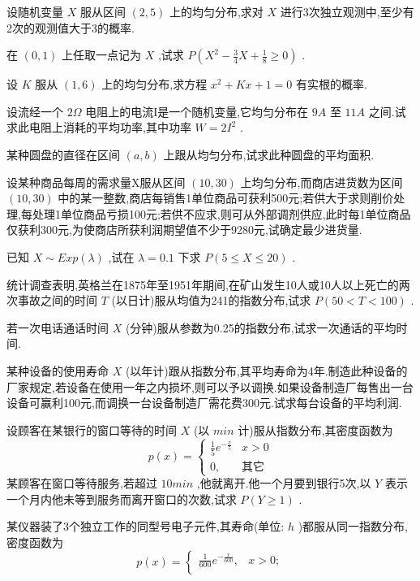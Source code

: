\begin{xiti}
\item 设随机变量 $ X $ 服从区间 $ (2,5) $ 上的均匀分布,求对 $ X $ 进行3次独立观测中,至少有2次的观测值大于3的概率.
\item 在 $ (0,1) $ 上任取一点记为 $ X $ ,试求 $ P\left(X^{2}-\frac{3}{4} X+\frac{1}{8} \geqslant 0\right) $ .
\item 设 $ K $ 服从 $ (1,6) $ 上的均匀分布,求方程 $ x^{2}+K x+1=0 $ 有实根的概率.
\item 设流经一个 $ 2 \Omega $ 电阻上的电流I是一个随机变量,它均匀分布在 $ 9A $ 至 $ 11A $ 之间.试求此电阻上消耗的平均功率,其中功率 $ W=2 I^{2} $ .
\item 某种圆盘的直径在区间 $ (a,b) $ 上跟从均匀分布,试求此种圆盘的平均面积.
\item 设某种商品每周的需求量X服从区间 $ (10,30) $ 上均匀分布,而商店进货数为区间 $ (10,30) $ 中的某一整数,商店每销售1单位商品可获利500元;若供大于求则削价处理,每处理1单位商品亏损100元;若供不应求,则可从外部调剂供应,此时每1单位商品仅获利300元,为使商店所获利润期望值不少于9280元,试确定最少进货量.
\item 已知 $ X \sim E x p(\lambda) $ ,试在 $ \lambda=0.1 $ 下求 $ P(5 \leqslant X \leqslant 20) $ .
\item 统计调查表明,英格兰在1875年至1951年期间,在矿山发生10人或10人以上死亡的两次事故之间的时间 $ T $ (以日计)服从均值为241的指数分布,试求 $ P(50<T<100) $ .
\item 若一次电话通话时间 $ X $ (分钟)服从参数为0.25的指数分布,试求一次通话的平均时间.
\item 某种设备的使用寿命 $ X $ (以年计)跟从指数分布,其平均寿命为4年.制造此种设备的厂家规定,若设备在使用一年之内损坏,则可以予以调换.如果设备制造厂每售出一台设备可赢利100元,而调换一台设备制造厂需花费300元.试求每台设备的平均利润.
\item 设顾客在某银行的窗口等待的时间 $ X $ (以 $ min $ 计)服从指数分布,其密度函数为
\[
p(x)=\left\{
\begin{array}{ll}
{\frac{1}{5} e^{-\frac{x}{5}}} & {x>0} \\ 
{0,}  &  {\text{其它}}
\end{array}\right.
\]
某顾客在窗口等待服务,若超过 $ 10min $ ,他就离开.他一个月要到银行5次,以 $ Y $ 表示一个月内他未等到服务而离开窗口的次数,试求 $ P(Y \geqslant 1) $ .
\item 某仪器装了3个独立工作的同型号电子元件,其寿命(单位: $ h $ )都服从同一指数分布,密度函数为
\[
p(x)=\left\{\begin{array}{ll}
{\frac{1}{600} e^{-\frac{x}{600}},} & {x>0 ;} \\ 

\end{array}\]
\end{xiti}
